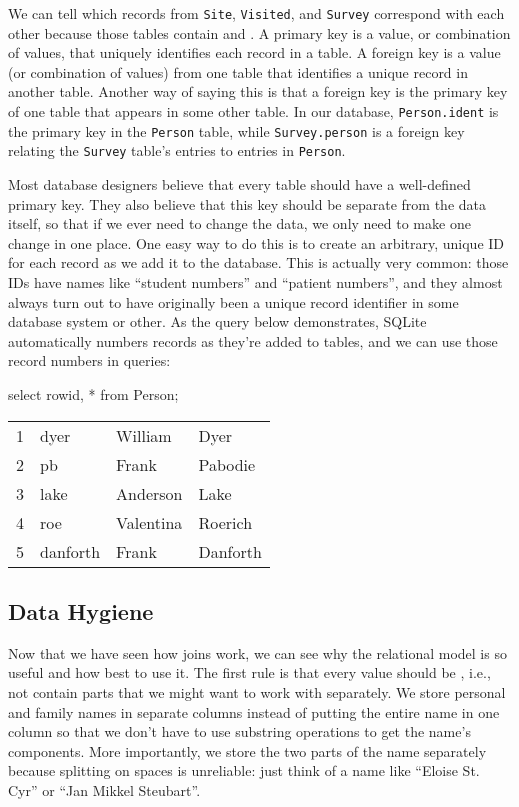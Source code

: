 \documentclass{book}
\begin{document}
We can tell which records from \texttt{Site}, \texttt{Visited}, and
\texttt{Survey} correspond with each other because those tables contain
 and
. A primary key is a value, or
combination of values, that uniquely identifies each record in a table.
A foreign key is a value (or combination of values) from one table that
identifies a unique record in another table. Another way of saying this
is that a foreign key is the primary key of one table that appears in
some other table. In our database, \texttt{Person.ident} is the primary
key in the \texttt{Person} table, while \texttt{Survey.person} is a
foreign key relating the \texttt{Survey} table's entries to entries in
\texttt{Person}.

Most database designers believe that every table should have a
well-defined primary key. They also believe that this key should be
separate from the data itself, so that if we ever need to change the
data, we only need to make one change in one place. One easy way to do
this is to create an arbitrary, unique ID for each record as we add it
to the database. This is actually very common: those IDs have names like
``student numbers'' and ``patient numbers'', and they almost always turn
out to have originally been a unique record identifier in some database
system or other. As the query below demonstrates, SQLite automatically
numbers records as they're added to tables, and we can use those record
numbers in queries:

\begin{VerbIn}
select rowid, * from Person;
\end{VerbIn}

\begin{tabular}{llll}
1 & dyer & William & Dyer \\
2 & pb & Frank & Pabodie \\
3 & lake & Anderson & Lake \\
4 & roe & Valentina & Roerich \\
5 & danforth & Frank & Danforth \\
\end{tabular}

\subsection{Data Hygiene}

Now that we have seen how joins work, we can see why the relational
model is so useful and how best to use it. The first rule is that every
value should be , i.e., not contain
parts that we might want to work with separately. We store personal and
family names in separate columns instead of putting the entire name in
one column so that we don't have to use substring operations to get the
name's components. More importantly, we store the two parts of the name
separately because splitting on spaces is unreliable: just think of a
name like ``Eloise St. Cyr'' or ``Jan Mikkel Steubart''.
\end{document}
